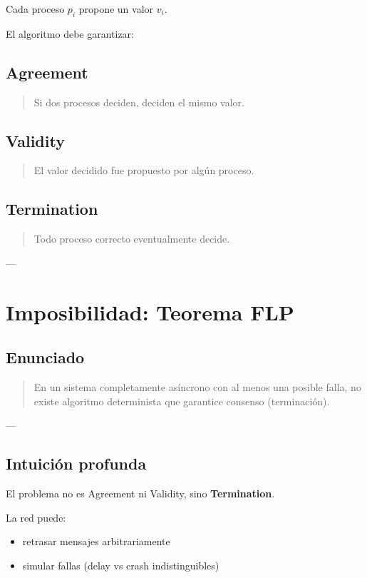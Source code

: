 \documentclass[variant=apuntes,cover=institutional,mode=screen]{ua-engineering-v6-article}
\begin{document}
Cada proceso $p_i$ propone un valor $v_i$.

El algoritmo debe garantizar:

\subsection{Agreement}
\begin{quote}
Si dos procesos deciden, deciden el mismo valor.
\end{quote}

\subsection{Validity}
\begin{quote}
El valor decidido fue propuesto por algún proceso.
\end{quote}

\subsection{Termination}
\begin{quote}
Todo proceso correcto eventualmente decide.
\end{quote}

---

\section{Imposibilidad: Teorema FLP}

\subsection{Enunciado}

\begin{quote}
En un sistema completamente asíncrono con al menos una posible falla, no existe algoritmo determinista que garantice consenso (terminación).
\end{quote}

---

\subsection{Intuición profunda}

El problema no es Agreement ni Validity, sino \textbf{Termination}.

La red puede:

\begin{itemize}
\item retrasar mensajes arbitrariamente
\item simular fallas (delay vs crash indistinguibles)
\end{itemize}
\end{document}
